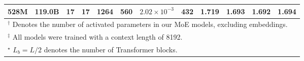 \begin{table}[t]
{\begin{tabular}{cccccccc cccc}
            528M & 119.0B         & 17 & 17 & 1264         & 560 & $2.02 \times 10^{-3}$ & 432 & 1.719    & 1.693                      & \textbf{1.692}            & 1.694                   \\
            \bottomrule
            \multicolumn{12}{l}{\rule{0pt}{3ex}$^\dagger$ Denotes the number of activated parameters in our MoE models, excluding embeddings.}                                               \\
            \multicolumn{12}{l}{$^\ddagger$ All models were trained with a context length of 8192.}                                                                                          \\
            \multicolumn{12}{l}{$^\star$ $L_b = L/2$ denotes the number of Transformer blocks.}
        \end{tabular}}
\end{table}


